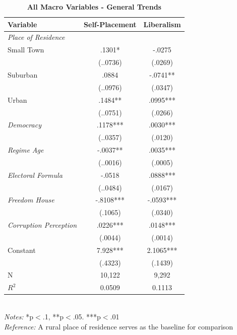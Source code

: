 \documentclass[12pt, titlepage]{article}
\newcommand\e{\emph}
\newcommand\tb{\textbf}
\begin{document}
\begin{table}[h!]
	\centering
	\caption{\tb{All Macro Variables - General Trends}}
	\begin{tabulary}{\linewidth}{l c c}

	\hline
	\tb{Variable}&\tb{Self-Placement}&\tb{Liberalism} \\
	\hline
	\e{Place of Residence} & & \\
	Small Town &.1301*&-.0275 \\
	&(..0736)&(.0269) \\
	Suburban& .0884& -.0741** \\
	&(..0976)& (.0347) \\
	Urban&.1484** & .0995*** \\
	&(..0751) & (.0266) \\
	\e{Democracy}& .1178***& .0030***\\
	&(..0357) & (.0120)\\
	\e{Regime Age} & -.0037** & .0035***\\
	&(..0016) & (.0005)\\
	\e{Electoral Formula}&-.0518& .0888***\\
	&(..0484) & (.0167) \\
	\e{Freedom House}& -.8108*** &-.0593*** \\
	&(.1065) & (.0340)  \\
	\e{Corruption Perception}&.0226***&.0148*** \\
	&(.0044)& (.0014)  \\
	\hline
	Constant& 7.928*** & 2.1065*** \\
	&(.4323) & (.1439)\\
	N&10,122 & 9,292 \\
	$R^2$&0.0509& 0.1113 \\
	\hline
	\end{tabulary}
	\\
\e{Notes:} *p$<$.1, **p$<$.05. ***p$<$.01 \\
\e{Reference:} A rural place of residence serves as the baseline for comparison
\label{table15}
\end{table}
\end{document}
